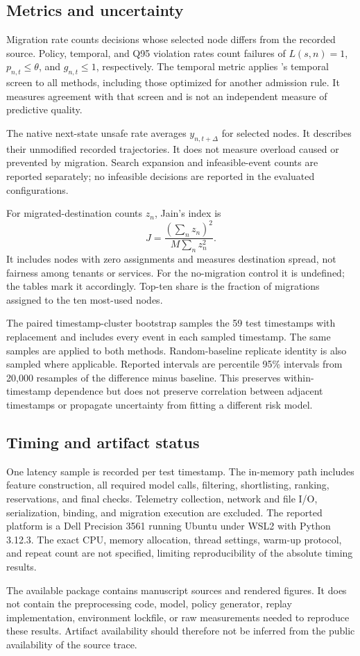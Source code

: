 \subsection{Metrics and uncertainty}
Migration rate counts decisions whose selected node differs from the
recorded source. Policy, temporal, and Q95 violation rates count failures
of $L(s,n)=1$, $p_{n,t}\leq\theta$, and $g_{n,t}\leq1$, respectively.
The temporal metric applies \cage's temporal screen to all methods,
including those optimized for another admission rule. It measures agreement
with that screen and is not an independent measure of predictive quality.

The native next-state unsafe rate averages $y_{n,t+\Delta}$ for selected
nodes. It describes their unmodified recorded trajectories. It does not
measure overload caused or prevented by migration. Search expansion and
infeasible-event counts are reported separately; no infeasible decisions
are reported in the evaluated configurations.

For migrated-destination counts $z_n$, Jain's index is
\begin{equation}
J=\frac{(\sum_n z_n)^2}{M\sum_n z_n^2}.
\end{equation}
It includes nodes with zero assignments and measures destination spread,
not fairness among tenants or services. For the no-migration control it is
undefined; the tables mark it accordingly. Top-ten share is the fraction
of migrations assigned to the ten most-used nodes.

The paired timestamp-cluster bootstrap samples the 59 test timestamps
with replacement and includes every event in each sampled timestamp.
The same samples are applied to both methods. Random-baseline replicate
identity is also sampled where applicable. Reported intervals are
percentile 95\% intervals from 20,000 resamples of the difference
\cage minus baseline. This preserves within-timestamp dependence but
does not preserve correlation between adjacent timestamps or propagate
uncertainty from fitting a different risk model.

\subsection{Timing and artifact status}
One latency sample is recorded per test timestamp. The in-memory path
includes feature construction, all required model calls, filtering,
shortlisting, ranking, reservations, and final checks. Telemetry collection,
network and file I/O, serialization, binding, and migration execution are
excluded. The reported platform is a Dell Precision 3561 running Ubuntu
under WSL2 with Python 3.12.3. The exact CPU, memory allocation, thread
settings, warm-up protocol, and repeat count are not specified, limiting
reproducibility of the absolute timing results.

The available package contains manuscript sources and rendered figures.
It does not contain the preprocessing code, model, policy generator,
replay implementation, environment lockfile, or raw measurements needed
to reproduce these results. Artifact availability should therefore not be
inferred from the public availability of the source trace.
